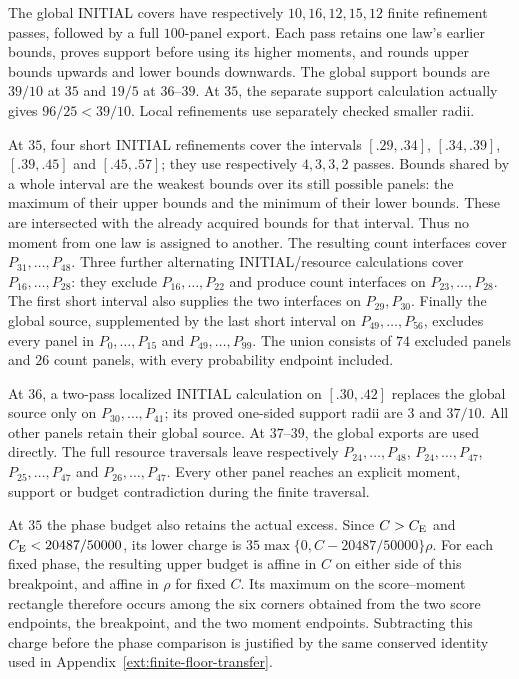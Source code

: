 The global INITIAL covers have respectively $10,16,12,15,12$ finite
refinement passes, followed by a full $100$-panel export. Each pass
retains one law's earlier bounds, proves support before using its
higher moments, and rounds upper bounds upwards and lower bounds
downwards. The global support bounds are $39/10$ at $35$ and $19/5$
at $36$--$39$. At $35$, the separate support calculation actually gives
$96/25<39/10$. Local refinements use separately checked smaller radii.

At $35$, four short INITIAL refinements cover the intervals
$[.29,.34]$, $[.34,.39]$, $[.39,.45]$ and $[.45,.57]$;
they use respectively $4,3,3,2$ passes. Bounds shared by a whole
interval are the weakest bounds over its still possible panels:
the maximum of their upper bounds and the minimum of their lower
bounds. These are intersected with the already acquired bounds for
that interval. Thus no moment from one law is assigned to another.
The resulting count interfaces cover $P_{31},\ldots,P_{48}$.
Three further alternating INITIAL/resource calculations cover
$P_{16},\ldots,P_{28}$: they exclude $P_{16},\ldots,P_{22}$
and produce count interfaces on $P_{23},\ldots,P_{28}$.
The first short interval also supplies the two interfaces on
$P_{29},P_{30}$. Finally the global source, supplemented by the last
short interval on $P_{49},\ldots,P_{56}$, excludes every panel in
$P_0,\ldots,P_{15}$ and $P_{49},\ldots,P_{99}$.
The union consists of $74$ excluded panels and $26$ count panels,
with every probability endpoint included.

At $36$, a two-pass localized INITIAL calculation on $[.30,.42]$
replaces the global source only on $P_{30},\ldots,P_{41}$; its proved
one-sided support radii are $3$ and $37/10$. All other panels retain
their global source. At $37$--$39$, the global exports are used directly.
The full resource traversals leave respectively
$P_{24},\ldots,P_{48}$, $P_{24},\ldots,P_{47}$,
$P_{25},\ldots,P_{47}$ and $P_{26},\ldots,P_{47}$.
Every other panel reaches an explicit moment, support or budget
contradiction during the finite traversal.


At $35$ the phase budget also retains the actual excess. Since
$C>C_{\mathrm E}$ and $C_{\mathrm E}<20487/50000$, its lower charge is
$35\max\{0,C-20487/50000\}\rho$. For each fixed phase, the resulting
upper budget is affine in $C$ on either side of this breakpoint,
and affine in $\rho$ for fixed $C$. Its maximum on the score--moment
rectangle therefore occurs among the six corners obtained from the
two score endpoints, the breakpoint, and the two moment endpoints.
Subtracting this charge before the phase comparison is justified by
the same conserved identity used in Appendix~\ref{ext:finite-floor-transfer}.

